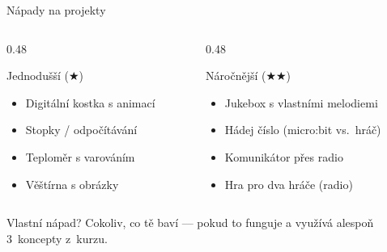 \begin{frame}{Nápady na projekty}

  \begin{columns}[T]
    \begin{column}{0.48\textwidth}
      \begin{block}{Jednodušší (\(\bigstar\))}
        \begin{itemize}
          \item Digitální kostka s animací
          \item Stopky / odpočítávání
          \item Teploměr s varováním
          \item Věštírna s obrázky
        \end{itemize}
      \end{block}
    \end{column}
    \begin{column}{0.48\textwidth}
      \begin{block}{Náročnější (\(\bigstar\bigstar\))}
        \begin{itemize}
          \item Jukebox s vlastními melodiemi
          \item Hádej číslo (micro:bit vs.\ hráč)
          \item Komunikátor přes radio
          \item Hra pro dva hráče (radio)
        \end{itemize}
      \end{block}
    \end{column}
  \end{columns}

  \bigskip
  \begin{exampleblock}{Vlastní nápad?}
    Cokoliv, co tě baví — pokud to funguje a využívá alespoň 3~koncepty z~kurzu.
  \end{exampleblock}
\end{frame}

